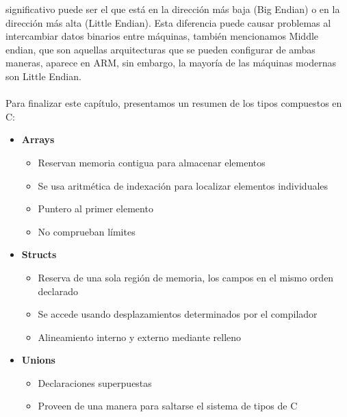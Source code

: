significativo puede ser el que está en la dirección más baja (Big Endian) o en la dirección más alta (Little Endian).
Esta diferencia puede causar problemas al intercambiar datos binarios entre máquinas, también mencionamos Middle endian, que son  
aquellas arquitecturas que se pueden configurar de ambas maneras, aparece en ARM, sin embargo, la mayoría de las máquinas modernas son Little Endian.
\\ \\ 
Para finalizar este capítulo, presentamos un resumen de los tipos compuestos en C:
\begin{itemize}
    \item \textbf{Arrays}
        \begin{itemize}
            \item Reservan memoria contigua para almacenar elementos
            \item Se usa aritmética de indexación para localizar elementos individuales
            \item Puntero al primer elemento
            \item No comprueban límites
        \end{itemize}
\item \textbf{Structs}
    \begin{itemize}
        \item Reserva de una sola región de memoria, los campos en el mismo orden declarado 
        \item Se accede usando desplazamientos determinados por el compilador
        \item Alineamiento interno y externo mediante relleno
    \end{itemize}
\item \textbf{Unions}
    \begin{itemize}
        \item Declaraciones superpuestas
        \item Proveen de una manera para saltarse el sistema de tipos de C
    \end{itemize}
\end{itemize}
